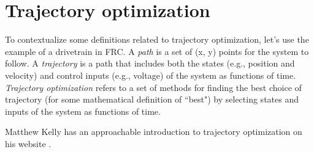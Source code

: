 
\chapter{Trajectory optimization}

To contextualize some definitions related to trajectory optimization, let's use
the example of a drivetrain in FRC. A \textit{path} is a set of (x, y) points
for the \gls{system} to follow. A \textit{trajectory} is a path that includes
both the states (e.g., position and velocity) and control inputs (e.g., voltage)
of the \gls{system} as functions of time. \textit{Trajectory optimization}
refers to a set of methods for finding the best choice of trajectory (for some
mathematical definition of ``best") by selecting states and inputs of the
\gls{system} as functions of time.

Matthew Kelly has an approachable introduction to trajectory optimization on his
website \cite{bib:intro_to_traj_opt}.
